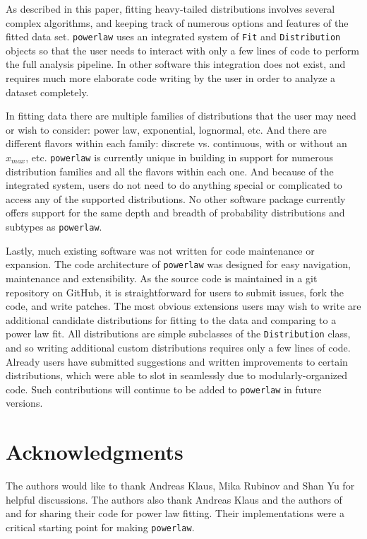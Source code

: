 \documentclass[10pt]{article}
\begin{document}
 
 As described in this paper, fitting heavy-tailed distributions involves several complex algorithms, and keeping track of numerous options and features of the fitted data set. \verb$powerlaw$ uses an integrated system of \verb$Fit$ and \verb$Distribution$ objects so that the user needs to interact with only a few lines of code to perform the full analysis pipeline. In other software this integration does not exist, and requires much more elaborate code writing by the user in order to analyze a dataset completely.
 
 In fitting data there are multiple families of distributions that the user may need or wish to consider: power law, exponential, lognormal, etc. And there are different flavors within each family: discrete vs. continuous, with or without an $x_{max}$, etc. \verb$powerlaw$ is currently unique in building in support for numerous distribution families and all the flavors within each one. And because of the integrated system, users do not need to do anything special or complicated to access any of the supported distributions. No other software package currently offers support for the same depth and breadth of probability distributions and subtypes as \verb$powerlaw$.
 
 Lastly, much existing software was not written for code maintenance or expansion. The code architecture of \verb$powerlaw$ was designed for easy navigation, maintenance and extensibility. As the source code is maintained in a git repository on GitHub, it is straightforward for users to submit issues, fork the code, and write patches. The most obvious extensions users may wish to write are additional candidate distributions for fitting to the data and comparing to a power law fit. All distributions are simple subclasses of the \verb$Distribution$ class, and so writing additional custom distributions requires only a few lines of code. Already users have submitted suggestions and written improvements to certain distributions, which were able to slot in seamlessly due to modularly-organized code. Such contributions will continue to be added to \verb$powerlaw$ in future versions.
 
 \section*{Acknowledgments}
 The authors would like to thank Andreas Klaus, Mika Rubinov and Shan Yu for helpful discussions. The authors also thank Andreas Klaus and the authors of \cite{Clauset2009} and \cite{Ginsburg2012} for sharing their code for power law fitting. Their implementations were a critical starting point for making \verb$powerlaw$.
 
\end{document}
